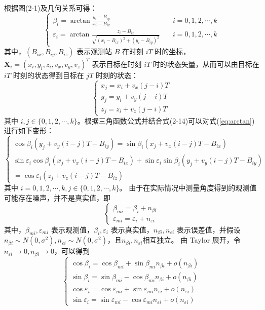 根据图(2-1)及几何关系可得：
\begin{equation}
	\begin{cases}
		\beta_i = \arctan \frac{y_i-B_{iy}}{x_i-B_{ix}} &i=0,1,2,\cdots,k \\
		\varepsilon_i = \arctan \frac{z_i-B_{iz}}{\sqrt{(x_i-B_{ix})^2 + (y_i - B_{iy})^2}} \quad &i=0,1,2,\cdots,k
	\end{cases}\label{eq:arctan}
\end{equation}
其中，$(B_{ix},B_{iy},B_{iz})$ 表示观测站 $B$ 在时刻 $iT$ 时的坐标，$\bm{X}_i = (x_i,y_i,z_i,v_x,v_y,v_z)^T$ 表示目标在时刻 $iT$ 时的状态矢量，从而可以由目标在 $iT$ 时刻的状态得到目标在 $jT$ 时刻的状态：
\begin{equation}
	\begin{cases}
		x_j = x_i + v_x(j-i)T\\
		y_j = y_i + v_y (j-i)T\\
		z_j = z_i + v_z(j-i)T
	\end{cases}
\end{equation}
其中 $i,j \in \lbrace 0,1,2,\cdots,k \rbrace$。根据三角函数公式并结合式(2-14)可以对式(\ref{eq:arctan})进行如下变形：
\begin{equation}
	\begin{cases}
		\cos\beta_i(y_j + v_y(i-j)T-B_{iy}) = \sin\beta_i(x_j+v_x(i-j)T-B_{ix}) \\
		\sin\varepsilon_i \cos\beta_i(x_j+v_x(i-j)T-B_{ix}) + \sin\varepsilon_i \sin\beta_i(y_j + v_y(i-j)T-B_{iy}) \\
		 = \cos\varepsilon_i (z_j + v_z(i-j)T - B_{iz})
	\end{cases}
\end{equation}
其中 $i=0,1,2,\cdots,k,j \in \lbrace 0,1,2,\cdots,k \rbrace$。
由于在实际情况中测量角度得到的观测值可能存在噪声，并不是真实值，即
\begin{equation}
	\begin{cases}
		\beta_{mi} = \beta_i + n_{\beta i} \\
		\varepsilon_{mi} = \varepsilon_i + n_{\varepsilon i}
	\end{cases}
\end{equation}
其中，$\beta_{mi},\varepsilon_{mi}$ 表示观测值，$\beta_i,\varepsilon_i$ 表示真实值，$n_{\beta i},n_{\varepsilon i}$ 表示误差值，并假设 $n_{\beta i} \sim N(0,\sigma^2),n_{\varepsilon i} \sim N(0,\sigma^2)$，且$n_{\beta i},n_{\varepsilon i}$相互独立。
由 Taylor 展开，令$n_{\varepsilon i} \rightarrow 0,n_{\beta i} \rightarrow 0$，可以得到
\begin{equation}
	\begin{cases}
		\cos\beta_i = \cos\beta_{mi} + \sin\beta_{mi}n_{\beta i} + o(n_{\beta i}) \\
		\sin\beta_i = \sin\beta_{mi} - \cos\beta_{mi}n_{\beta i} + o(n_{\beta i}) \\
		\cos\varepsilon_i = \cos\varepsilon_{mi} + \sin\varepsilon_{mi}n_{\varepsilon i} + o(n_{\varepsilon i}) \\
		\sin\varepsilon_i = \sin\varepsilon_{mi} - \cos\varepsilon_{mi}n_{\varepsilon i} + o(n_{\varepsilon i})
	\end{cases}
\end{equation}
